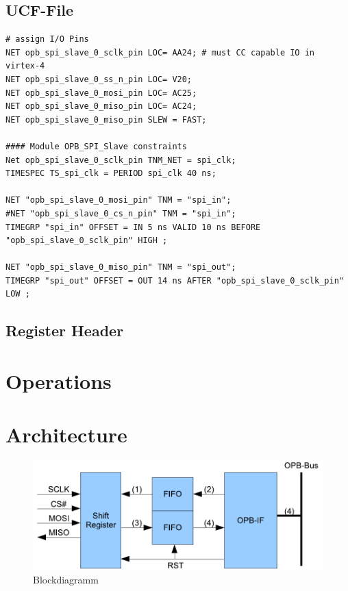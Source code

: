 \section{UCF-File}
\begin{verbatim}
# assign I/O Pins 
NET opb_spi_slave_0_sclk_pin LOC= AA24; # must CC capable IO in virtex-4
NET opb_spi_slave_0_ss_n_pin LOC= V20;
NET opb_spi_slave_0_mosi_pin LOC= AC25;
NET opb_spi_slave_0_miso_pin LOC= AC24;
NET opb_spi_slave_0_miso_pin SLEW = FAST;

#### Module OPB_SPI_Slave constraints
Net opb_spi_slave_0_sclk_pin TNM_NET = spi_clk;
TIMESPEC TS_spi_clk = PERIOD spi_clk 40 ns;

NET "opb_spi_slave_0_mosi_pin" TNM = "spi_in";
#NET "opb_spi_slave_0_cs_n_pin" TNM = "spi_in";
TIMEGRP "spi_in" OFFSET = IN 5 ns VALID 10 ns BEFORE "opb_spi_slave_0_sclk_pin" HIGH ;

NET "opb_spi_slave_0_miso_pin" TNM = "spi_out";
TIMEGRP "spi_out" OFFSET = OUT 14 ns AFTER "opb_spi_slave_0_sclk_pin" LOW ;
\end{verbatim}

\section{Register Header}




\chapter{Operations}

\chapter{Architecture}

\begin{figure}[h]
	\centering
		\includegraphics[width=1.00\textwidth]{Grafik/block_diagramm}
	\caption{Blockdiagramm}
	\label{fig:blockdiagramm}
\end{figure}

